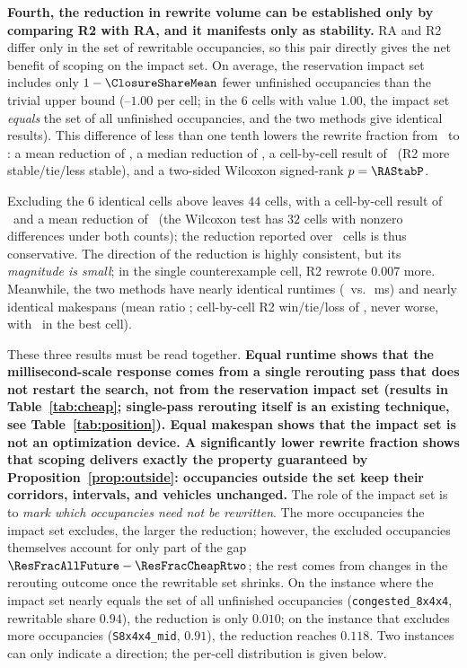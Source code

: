\textbf{Fourth, the reduction in rewrite volume can be established only by comparing R2 with RA, and it manifests only as stability.} RA and R2 differ only in the set of rewritable occupancies, so this pair
directly gives the net benefit of scoping on the impact set. On average, the reservation impact set includes only \(1-\ClosureShareMean\) fewer
unfinished occupancies than the trivial upper bound (\ClosureShareLo--\(1.00\) per cell; in the \(6\) cells with value \(1.00\), the impact set \emph{equals}
the set of all unfinished occupancies, and the two methods give identical results). This difference of less than one tenth lowers the rewrite fraction from \ResFracAllFuture\ to
\ResFracCheapRtwo: a mean reduction of \RAStabMean, a median reduction of \RAStabMed, a cell-by-cell result of \RAStabWTL\ (R2 more stable/tie/less stable),
and a two-sided Wilcoxon signed-rank \(p=\RAStabP\).

Excluding the \(6\) identical cells above leaves \(44\) cells, with a cell-by-cell result of \RAStabWTLNet\ and a mean reduction of \RAStabMeanNet\
(the Wilcoxon test has \(32\) cells with nonzero differences under both counts); the reduction reported over \NPairs\ cells is thus conservative.
The direction of the reduction is highly consistent, but its \emph{magnitude is small}; in the single counterexample cell, R2 rewrote \(0.007\) more.
Meanwhile, the two methods have nearly identical runtimes (\MsCheapRtwo\ vs.\ \MsAllFuture\,ms)
and nearly identical makespans (mean ratio \RACmaxRatio; cell-by-cell R2 win/tie/loss of \WinVsAllFuture, never worse,
with \RACmaxLo\ in the best cell).

These three results must be read together. \textbf{Equal runtime shows that the millisecond-scale response comes from a single rerouting pass that does not restart the search, not from the reservation impact set
(results in Table~\ref{tab:cheap}; single-pass rerouting itself is an existing technique, see Table~\ref{tab:position}).
Equal makespan shows that the impact set is not an optimization device.
A significantly lower rewrite fraction shows that scoping delivers exactly the property guaranteed by Proposition~\ref{prop:outside}: occupancies outside the set keep their corridors, intervals, and vehicles unchanged.}
The role of the impact set is to \emph{mark which occupancies need not be rewritten}.
The more occupancies the impact set excludes, the larger the reduction; however, the excluded occupancies themselves account for only part of
the gap \(\ResFracAllFuture-\ResFracCheapRtwo\); the rest comes from changes in the rerouting outcome once the rewritable set shrinks.
On the instance where the impact set nearly equals the set of all unfinished occupancies (\texttt{congested\_8x4x4}, rewritable share \(0.94\)),
the reduction is only \(0.010\); on the instance that excludes more occupancies (\texttt{S8x4x4\_mid}, \(0.91\)), the reduction reaches \(0.118\).
Two instances can only indicate a direction; the per-cell distribution is given below.

